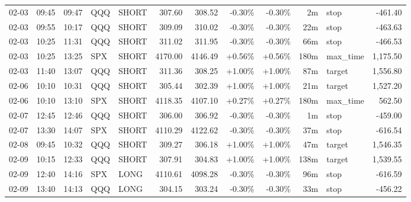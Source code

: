 \documentclass[11pt,a4paper,twoside]{article}
\begin{document}
\begin{center}
\begin{longtable}{>{\color{txtmain}}l l l l l r r r r r >{\color{txtmain}}l r}
02-03 & 09:45 & 09:47 & QQQ & SHORT & 307.60 & 308.52 & \textcolor{lossred}{-0.30\%} & \textcolor{lossred}{-0.30\%} & 2m & stop & \textcolor{lossred}{-461.40} \\
02-03 & 09:55 & 10:17 & QQQ & SHORT & 309.09 & 310.02 & \textcolor{lossred}{-0.30\%} & \textcolor{lossred}{-0.30\%} & 22m & stop & \textcolor{lossred}{-463.63} \\
02-03 & 10:25 & 11:31 & QQQ & SHORT & 311.02 & 311.95 & \textcolor{lossred}{-0.30\%} & \textcolor{lossred}{-0.30\%} & 66m & stop & \textcolor{lossred}{-466.53} \\
02-03 & 10:25 & 13:25 & SPX & SHORT & 4170.00 & 4146.49 & \textcolor{wingreen}{+0.56\%} & \textcolor{wingreen}{+0.56\%} & 180m & max\_time & \textcolor{wingreen}{1,175.50} \\
02-03 & 11:40 & 13:07 & QQQ & SHORT & 311.36 & 308.25 & \textcolor{wingreen}{+1.00\%} & \textcolor{wingreen}{+1.00\%} & 87m & target & \textcolor{wingreen}{1,556.80} \\
02-06 & 10:10 & 10:31 & QQQ & SHORT & 305.44 & 302.39 & \textcolor{wingreen}{+1.00\%} & \textcolor{wingreen}{+1.00\%} & 21m & target & \textcolor{wingreen}{1,527.20} \\
02-06 & 10:10 & 13:10 & SPX & SHORT & 4118.35 & 4107.10 & \textcolor{wingreen}{+0.27\%} & \textcolor{wingreen}{+0.27\%} & 180m & max\_time & \textcolor{wingreen}{562.50} \\
02-07 & 12:45 & 12:46 & QQQ & SHORT & 306.00 & 306.92 & \textcolor{lossred}{-0.30\%} & \textcolor{lossred}{-0.30\%} & 1m & stop & \textcolor{lossred}{-459.00} \\
02-07 & 13:30 & 14:07 & SPX & SHORT & 4110.29 & 4122.62 & \textcolor{lossred}{-0.30\%} & \textcolor{lossred}{-0.30\%} & 37m & stop & \textcolor{lossred}{-616.54} \\
02-08 & 09:45 & 10:32 & QQQ & SHORT & 309.27 & 306.18 & \textcolor{wingreen}{+1.00\%} & \textcolor{wingreen}{+1.00\%} & 47m & target & \textcolor{wingreen}{1,546.35} \\
02-09 & 10:15 & 12:33 & QQQ & SHORT & 307.91 & 304.83 & \textcolor{wingreen}{+1.00\%} & \textcolor{wingreen}{+1.00\%} & 138m & target & \textcolor{wingreen}{1,539.55} \\
02-09 & 12:40 & 14:16 & SPX & LONG & 4110.61 & 4098.28 & \textcolor{lossred}{-0.30\%} & \textcolor{lossred}{-0.30\%} & 96m & stop & \textcolor{lossred}{-616.59} \\
02-09 & 13:40 & 14:13 & QQQ & LONG & 304.15 & 303.24 & \textcolor{lossred}{-0.30\%} & \textcolor{lossred}{-0.30\%} & 33m & stop & \textcolor{lossred}{-456.22} \\

\end{longtable}
\end{center}
\end{document}
